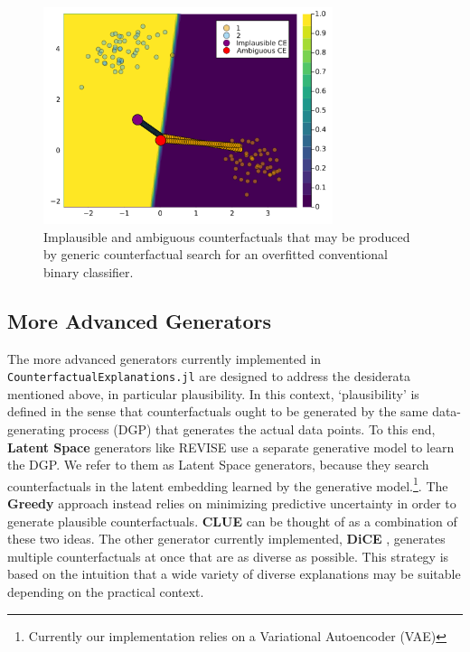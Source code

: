 \documentclass{juliacon}
\begin{document}
\begin{figure}

{\centering \includegraphics[width=3.33333in,height=2.5in]{www/binary_wrong.png}

}

\caption{\label{fig-binary-wrong}Implausible and ambiguous
counterfactuals that may be produced by generic counterfactual search
for an overfitted conventional binary classifier.}

\end{figure}

\hypertarget{more-advanced-generators}{%
\subsection{More Advanced Generators}\label{more-advanced-generators}}

The more advanced generators currently implemented in
\texttt{CounterfactualExplanations.jl} are designed to address the
desiderata mentioned above, in particular plausibility. In this context,
`plausibility' is defined in the sense that counterfactuals ought to be
generated by the same data-generating process (DGP) that generates the
actual data points. To this end, \textbf{Latent Space} generators like
REVISE \cite{joshi2019realistic} use a separate generative model to
learn the DGP. We refer to them as Latent Space generators, because they
search counterfactuals in the latent embedding learned by the generative
model.\footnote{Currently our implementation relies on a Variational
  Autoencoder (VAE)}. The \textbf{Greedy} approach
\cite{schut2021generating} instead relies on minimizing predictive
uncertainty in order to generate plausible counterfactuals.
\textbf{CLUE} \cite{antoran2020getting} can be thought of as a
combination of these two ideas. The other generator currently
implemented, \textbf{DiCE} \cite{mothilal2020explaining}, generates
multiple counterfactuals at once that are as diverse as possible. This
strategy is based on the intuition that a wide variety of diverse
explanations may be suitable depending on the practical context.
\end{document}
